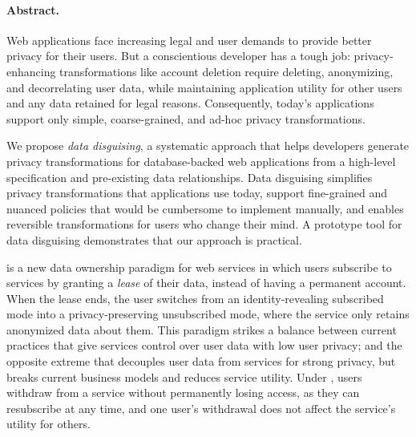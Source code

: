 \paragraph{Abstract.}
Web applications face increasing legal and user demands to provide better privacy for their users.
%
But a conscientious developer has a tough job: privacy-enhancing transformations
like account deletion require deleting, anonymizing, and decorrelating user data, while
maintaining application utility for other users and any data retained for legal reasons.
%
Consequently, today's applications support only simple, coarse-grained, and ad-hoc privacy
transformations.
%

We propose \emph{data disguising}, a systematic approach that helps developers generate
privacy transformations for database-backed web applications from a high-level specification
and pre-existing data relationships.
%
Data disguising simplifies privacy transformations that applications use today, support
fine-grained and nuanced policies that would be cumbersome to implement manually, and
enables reversible transformations for users who change their mind.
%
%
A prototype tool for data disguising demonstrates that our approach is practical.

\iffalse
%
\name is a new data ownership paradigm for web services in which users subscribe to
services by granting a \emph{lease} of their data, instead of having a permanent account.
%
When the lease ends, the user switches from an identity-revealing
subscribed mode into a privacy-preserving unsubscribed mode, where the
service only retains anonymized data about them.
%
This paradigm strikes a balance between current practices that give services control over user
    data with low user privacy; and the opposite extreme that decouples user data from
    services for strong privacy, but breaks current business models and reduces service utility.
%
Under \name, users withdraw from a service without permanently losing access,
as they can resubscribe at any time, and one user's withdrawal does not affect
the service's utility for others.

